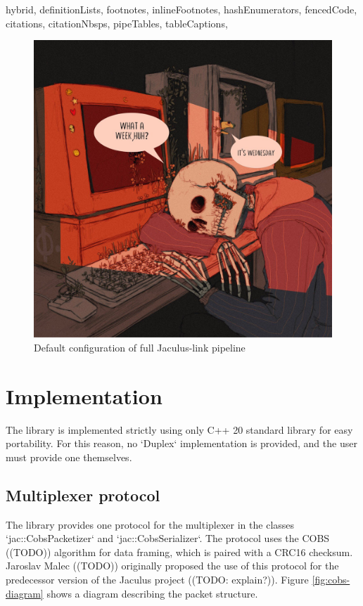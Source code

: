 \documentclass[
  digital,
  oneside,
  nosansbold,
  nocolorbold,
  lof,
  lot
]{fithesis4}
\begin{document}
\begin{markdown*}{%
  hybrid,
  definitionLists,
  footnotes,
  inlineFootnotes,
  hashEnumerators,
  fencedCode,
  citations,
  citationNbsps,
  pipeTables,
  tableCaptions,
}
\begin{figure}[ht]
    \centering
    \includegraphics[width=\textwidth]{link-pipeline}
    \caption{Default configuration of full Jaculus-link pipeline}
    \label{fig:link-pipeline}
\end{figure}


\section{Implementation}

The library is implemented strictly using only C++ 20 standard library for easy portability. For this reason, no `Duplex` implementation is provided, and the user must provide one themselves.

\subsection{Multiplexer protocol}

The library provides one protocol for the multiplexer in the classes `jac::CobsPacketizer` and `jac::CobsSerializer`. The protocol uses the COBS ((TODO)) algorithm for data framing, which is paired with a CRC16 checksum.  Jaroslav Malec ((TODO)) originally proposed the use of this protocol for the predecessor version of the Jaculus project ((TODO: explain?)). Figure \ref{fig:cobs-diagram} shows a diagram describing the packet structure.


\end{markdown*}
\end{document}
